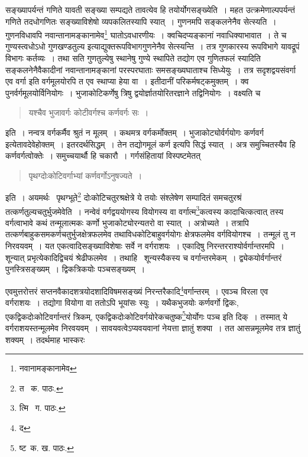 \documentclass[11pt, openany]{book}
\begin{document}
{\noindent सङ्ख्यापर्यन्तं गणिते यावती सङ्ख्या सम्पद्यते तावत्येव हि तयोर्योगसङ्ख्येति~। महत उत्क्रमेणाल्पपर्यन्तं गणिते तदधोगणितः सङ्ख्याविशेषो व्यपकलितस्यापि स्यात्~। गुणनमपि सङ्कलनेनैव सेत्स्यति~। गुणनविधावपि नवान्तानामङ्कानामेव\renewcommand{\thefootnote}{१}\footnote{नवानामङ्कानामेव} घातोऽवधारणीयः~। क्वचिदप्यङ्कानां नवाधिक्याभावात~। ते च {\qt गुण्यस्त्वधोऽधो गुणखण्डतुल्य} इत्याद्युक्तरूपविभागगुणनेनैव
सेत्स्यन्ति~। तत्र गुणकारस्य रूपविभागे यावद्रूपं विभागः कर्तव्यः~। तथा सति गुणतुल्येषु स्थानेषु गुण्ये स्थापिते तद्योग एव गुणितफलं स्यादिति सङ्कलनेनैवैकादीनां नवान्तानामङ्कानां परस्परघाताः समसङ्ख्यघाताश्च सिध्येयुः~। तत्र {\qt सदृशद्वयसंवर्गा एव वर्गा} इति वर्गमूलयोरपि त एव स्थाप्या हेया वा~। इतीदानीं परिकर्मषट्कमुक्तम्~। क्व पुनर्वर्गमूलयोर्विनियोगः~।
भुजाकोटिकर्णेषु त्रिषु द्वयोर्ज्ञातयोरितरज्ञाने तद्विनियोगः~। वक्ष्यति च\textendash 

\begin{quote}
{\qt यश्चैव भुजावर्गः कोटीवर्गश्च कर्णवर्गः सः~।}
\end{quote}

इति~। नन्वत्र वर्गकर्मैव श्रुतं न मूलम्~। कथमत्र वर्गकर्मोक्तम्~। भुजाकोट्योर्वर्गयोगः कर्णवर्ग इत्येतावदेवेहोक्तम्~। इतरदर्थसिद्धम्~। तेन तद्योगमूलं कर्ण इत्यपि सिद्धं स्यात्~। अत्र समुच्चितस्यैव हि कर्णवर्गत्वोक्तेः~। समुच्चयार्थौ हि चकारौ~। गर्गसंहितायां विस्पष्टमेतत्

\begin{quote}
{\qt पृथग्दोःकोटिवर्गाभ्यां कर्णवर्गोऽनुषज्यते~।}
\end{quote}

इति~। अयमर्थः \textendash\ पृथग्भूते\renewcommand{\thefootnote}{२}\footnote{त \textendash\ क. पाठः.} दोःकोटिचतुरश्रक्षेत्रे ये तयोः संश्लेषेण सम्पादितं समचतुरश्रं तत्कर्णतुल्यचतुर्भुजमेवेति~। नन्वेवं वर्गद्वययोगस्य वियोगस्य वा वर्गात्म\renewcommand{\thefootnote}{३}\footnote{त्मि \textendash\ ग. पाठः.}कत्वस्य कादाचित्कत्वात् तस्य वर्गत्वाभावे कथं तन्मूलात्मकः कर्णो भुजाकोट्योरन्यतरो वा स्यात्~। अत्रोच्यते~। तत्रापि तत्कर्णबाहुकसमकर्णचतुर्भुजक्षेत्रफलमेव तथाविधकोटिबाहुवर्गयोगः क्षेत्रफलमेव वर्गवियोगश्च~। तन्मूलं तु न निरवयवम्~। यत एकत्वादिसङ्ख्याविशेषाः सर्वे न वर्गराशयः~। एकादिषु निरन्तरराश्योर्वर्गान्तरमपि~। शून्यात् प्रभृत्येकादिद्विचयं श्रेढीफलमेव~। तथाहि \textendash\ शून्यस्यैकस्य च वर्गान्तरमेकम्~। द्व्येकयोर्वर्गान्तरं पुनस्त्रिसङ्ख्यम्~। द्विकत्रिकयोः पञ्चसङ्ख्यम्~। 

\newpage

\noindent एवमुत्तरोत्तरं सप्तनवैकादशत्रयोदशादिविषमसङ्ख्यं निरन्तरैकादि\renewcommand{\thefootnote}{१}\footnote{द}वर्गान्तरम्~। एवञ्च विरला एव वर्गराशयः~। तद्योगा वियोगा वा ततोऽपि भूयांसः स्युः~। यथैकभुजयोः कर्णवर्गो द्विकः, एकद्विकदोःकोटिवर्गान्तरं त्रिकम्, एकद्विकदोःकोटिवर्गयोरेकचतुष्क\renewcommand{\thefootnote}{२}\footnote{ष्ट\textendash\ क. ख. पाठः.}योर्योगः पञ्च इति दिक्~। तस्मात् ये वर्गराशयस्तन्मूलमेव निरवयवम्~। सावयवत्वेऽप्यवयवानां नेयत्ता ज्ञातुं शक्या~। तत आसन्नमूलमेव तत्र ज्ञातुं शक्यम्~। तदर्थमाह भास्करः\textendash 

}
\end{document}
